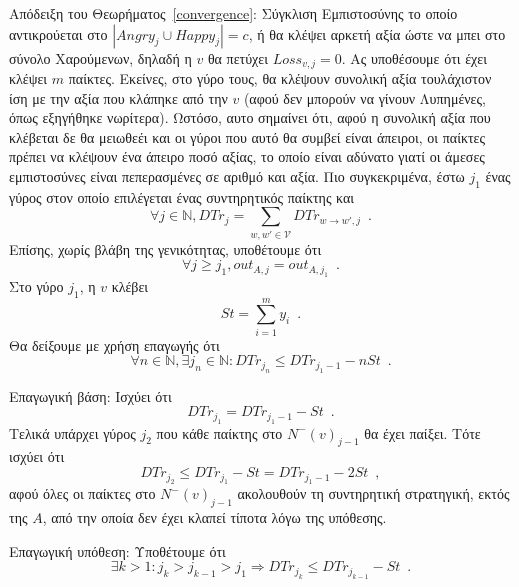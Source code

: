 \begin{sepproof}{Απόδειξη του Θεωρήματος~\ref{convergence}: Σύγκλιση Εμπιστοσύνης}
  το οποίο αντικρούεται στο $|Angry_j \cup Happy_j| = c$, ή θα κλέψει αρκετή αξία ώστε να μπει στο σύνολο Χαρούμενων, δηλαδή η
  $v$ θα πετύχει $Loss_{v, j} = 0$. Ας υποθέσουμε ότι έχει κλέψει $m$ παίκτες. Εκείνες, στο γύρο τους, θα κλέψουν συνολική
  αξία τουλάχιστον ίση με την αξία που κλάπηκε από την $v$ (αφού δεν μπορούν να γίνουν Λυπημένες, όπως εξηγήθηκε νωρίτερα).
  Ωστόσο, αυτο σημαίνει ότι, αφού η συνολική αξία που κλέβεται δε θα μειωθεέι και οι γύροι που αυτό θα συμβεί είναι άπειροι,
  οι παίκτες πρέπει να κλέψουν ένα άπειρο ποσό αξίας, το οποίο είναι αδύνατο γιατί οι άμεσες εμπιστοσύνες είναι πεπερασμένες
  σε αριθμό και αξία. Πιο συγκεκριμένα, έστω $j_1$ ένας γύρος στον οποίο επιλέγεται ένας συντηρητικός παίκτης και
  \begin{equation*}
    \forall j \in \mathbb{N}, DTr_j = \sum\limits_{w,w' \in \mathcal{V}}DTr_{w \rightarrow w', j} \enspace.
  \end{equation*}
  Επίσης, χωρίς βλάβη της γενικότητας, υποθέτουμε ότι
  \begin{equation*}
    \forall j \geq j_1, out_{A, j} = out_{A, j_1} \enspace.
  \end{equation*}
  Στο γύρο $j_1$, η $v$ κλέβει
  \begin{equation*}
    St = \sum\limits_{i=1}^{m}y_i \enspace.
  \end{equation*}
  Θα δείξουμε με χρήση επαγωγής ότι
  \begin{equation*}
    \forall n \in \mathbb{N}, \exists j_n \in \mathbb{N} : DTr_{j_n} \leq DTr_{j_1-1} - nSt \enspace.
  \end{equation*}

  Επαγωγική βάση: Ισχύει ότι
  \begin{equation*}
    DTr_{j_1} = DTr_{j_1-1} - St \enspace.
  \end{equation*}
  Τελικά υπάρχει γύρος $j_2$ που κάθε παίκτης στο $N^{-}(v)_{j-1}$ θα έχει παίξει. Τότε ισχύει ότι
  \begin{equation*}
    DTr_{j_2} \leq DTr_{j_1} - St = DTr_{j_1-1} - 2St \enspace,
  \end{equation*}
  αφού όλες οι παίκτες στο $N^{-}(v)_{j-1}$ ακολουθούν τη συντηρητική στρατηγική, εκτός της $A$, από την οποία δεν έχει κλαπεί
  τίποτα λόγω της υπόθεσης.

  Επαγωγική υπόθεση: Υποθέτουμε ότι
  \begin{equation*}
    \exists k > 1 : j_k > j_{k-1} > j_1 \Rightarrow DTr_{j_k} \leq DTr_{j_{k-1}} - St \enspace.
  \end{equation*}


\end{sepproof}
